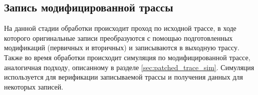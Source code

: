 \subsection{Запись модифицированной трассы} \label{sec:trace_write}

На данной стадии обработки происходит проход по исходной трассе, в ходе которого оригинальные записи преобразуются с помощью подготовленных модификаций (первичных и вторичных) и записываются в выходную трассу. Также во время обработки происходит симуляция по модифицированной трассе, аналогичная подходу, описанному в разделе \ref{sec:patched_trace_sim}. Симуляция используется для верификации записываемой трассы и получения данных для некоторых записей.
